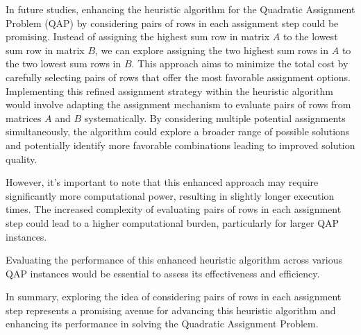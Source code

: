 In future studies, enhancing the heuristic algorithm for the Quadratic Assignment Problem (QAP) by considering pairs of rows in each assignment step
could be promising.
Instead of assigning the highest sum row in matrix \(A\) to the lowest sum row in matrix \(B\),
we can explore assigning the two highest sum rows in \(A\) to the two lowest sum rows in \(B\).
This approach aims to minimize the total cost by carefully selecting pairs of rows that offer the most favorable assignment options.
Implementing this refined assignment strategy within the heuristic algorithm would involve adapting the assignment mechanism to evaluate pairs of rows
from matrices \(A\) and \(B\) systematically.
By considering multiple potential assignments simultaneously, the algorithm could explore a broader range of possible solutions
and potentially identify more favorable combinations leading to improved solution quality.

However, it's important to note that this enhanced approach may require significantly more computational power,
resulting in slightly longer execution times.
The increased complexity of evaluating pairs of rows in each assignment step could lead to a higher computational burden,
particularly for larger QAP instances.

Evaluating the performance of this enhanced heuristic algorithm across various QAP instances
would be essential to assess its effectiveness and efficiency.

In summary, exploring the idea of considering pairs of rows in each assignment step represents a promising avenue for advancing
this heuristic algorithm and enhancing its performance in solving the Quadratic Assignment Problem.

\pagebreak



